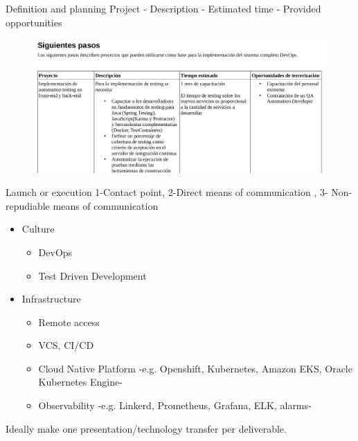 \documentclass[aspectratio=169]{beamer}
\begin{document}
\begin{frame}{Definition and planning}
Project - Description - Estimated time - Provided opportunities
\begin{figure}
\centering
\includegraphics[width=0.8\linewidth]{Images/pasos}
\end{figure}
\end{frame}

\begin{frame}{Launch or execution}
1-Contact point, 2-Direct means of communication , 3- Non-repudiable means of communication


\begin{itemize}
    \item Culture
        \begin{itemize}
        \item DevOps
        \item Test Driven Development
        \end{itemize}
    \item  Infrastructure
        \begin{itemize}
        \item Remote access
        \item VCS, CI/CD
        \item Cloud Native Platform -e.g. Openshift, Kubernetes, Amazon EKS, Oracle Kubernetes Engine-
        \item Observability -e.g. Linkerd, Prometheus, Grafana, ELK, alarms-
        \end{itemize}
 \end{itemize}
Ideally make one presentation/technology transfer per deliverable.
\end{frame}
\end{document}

